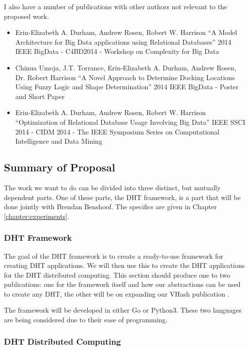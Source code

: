 	

I also have a number of publications with other authors not relevant to the proposed work.
\begin{itemize}
	\item  Erin-Elizabeth A. Durham, Andrew Rosen, Robert W. Harrison
	``A Model Architecture for Big Data applications using Relational Databases''
	2014 IEEE BigData - C4BD2014 - Workshop on Complexity for Big Data  \cite{durham2014model}
	\item Chinua Umoja, J.T. Torrance, Erin-Elizabeth A. Durham, Andrew Rosen, Dr. Robert Harrison
	``A Novel Approach to Determine Docking Locations Using Fuzzy Logic and Shape Determination''
	2014 IEEE BigData - Poster and Short Paper \cite{umoja2014novel}
	\item  Erin-Elizabeth A. Durham, Andrew Rosen, Robert W. Harrison
	``Optimization of Relational Database Usage Involving Big Data'' 
	IEEE SSCI 2014 - CIDM 2014 - The IEEE Symposium Series on Computational Intelligence and Data Mining \cite{durham2014optimization}
\end{itemize}

\subsection{Summary of Proposal}


The work we want to do can be divided into three distinct, but mutually dependent parts.
One of these parts, the DHT framework, is a part that will be done jointly with Brendan Benshoof.
The specifics are given in Chapter \ref{chapter:experiments}.


\subsubsection{DHT Framework}
The goal of the DHT framework is to create a ready-to-use framework for creating DHT applications.
We will then use this to create the DHT applications for the DHT distributed computing.
This section should produce one to two publications:  one for the framework itself and how our abstractions can be used to create any DHT, the other will be on expanding our VHash publication \cite{vhash}.

The framework will be developed in either Go or Python3.
These two languages are being considered due to their ease of programming.


\subsubsection{DHT Distributed Computing}


